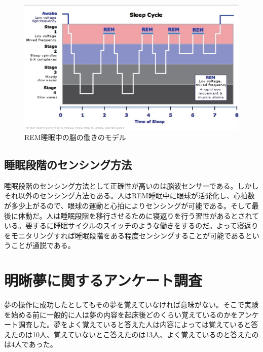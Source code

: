 \begin{figure}[htbp]
\begin{center}
\includegraphics[width=15cm]{eps/SleepHypnogram.eps}
\caption{REM睡眠中の脳の働きのモデル}
\label{SleepHypnogram}
\end{center}
\end{figure}

\subsection{睡眠段階のセンシング方法}
睡眠段階のセンシング方法として正確性が高いのは脳波センサーである。しかしそれ以外のセンシング方法もある。人はREM睡眠中に眼球が活発化し、心拍数が多少上がるので、眼球の運動と心拍によりセンシングが可能である。そして最後に体動だ。人は睡眠段階を移行させるために寝返りを行う習性があるとされている。要するに睡眠サイクルのスイッチのような働きをするのだ。\cite{negaeri}よって寝返りをモニタリングすれば睡眠段階をある程度センシングすることが可能であるということが通説である。

\section{明晰夢に関するアンケート調査}
夢の操作に成功したとしてもその夢を覚えていなければ意味がない。そこで実験を始める前に一般的に人は夢の内容を起床後どのくらい覚えているのかをアンケート調査した。夢をよく覚えていると答えた人は内容によっては覚えていると答えたのは10人、覚えていないとこ答えたのは13人、よく覚えているのと答えたのは4人であった。

